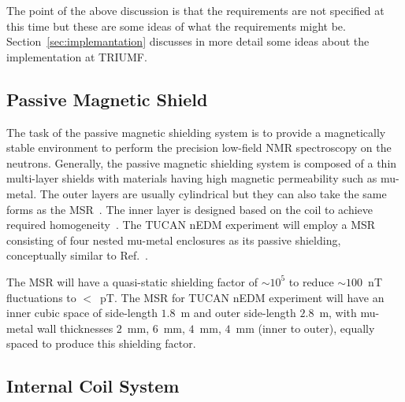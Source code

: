 The point of the above discussion is that the requirements are not specified at this time but these are some ideas of what the requirements might be. Section~\ref{sec:implemantation} discusses in more detail some ideas about the implementation at TRIUMF.



\subsection{Passive Magnetic Shield}\label{sec:passive}
The task of the passive magnetic shielding system is to provide a magnetically stable environment to perform the precision low-field NMR spectroscopy on the neutrons. Generally, the passive magnetic shielding system is composed of a thin multi-layer shields with materials having high magnetic permeability such as mu-metal. The outer layers are usually cylindrical \cite{mu_cyl_1,mu_cyl_2} but they can also take the same forms as the MSR~\cite{mu_msr_1,mu_msr_2}. The inner layer is designed based on the coil to achieve required homogeneity~\cite{mu_inner_1,mu_inner_2}. The TUCAN nEDM experiment will employ a MSR consisting of four nested mu-metal enclosures as its passive shielding, conceptually similar to Ref.~\cite{msr_design}.  


The MSR will have a quasi-static shielding factor of $\sim\mathrm{10^{5}}$ to reduce $\sim100$~nT fluctuations to $<$~pT. The MSR for TUCAN nEDM experiment will have an inner cubic space of side-length $1.8$~m and outer side-length $2.8$~m, with mu-metal wall thicknesses $2$~mm, $6$~mm, $4$~mm, $4$~mm (inner to outer), equally spaced to produce this shielding factor. 


\subsection{Internal Coil System}

